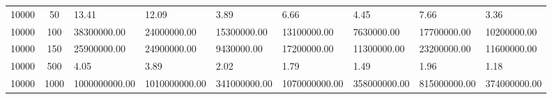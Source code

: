 \begin{table*}
\begin{center}
\begin{tabular}{cc|lllllll}
10000 & 50   & 13.41         & 12.09         & 3.89         & 6.66          & 4.45         & 7.66         & 3.36         \\
10000 & 100  & 38300000.00   & 24000000.00   & 15300000.00  & 13100000.00   & 7630000.00   & 17700000.00  & 10200000.00  \\
10000 & 150  & 25900000.00   & 24900000.00   & 9430000.00   & 17200000.00   & 11300000.00  & 23200000.00  & 11600000.00  \\
10000 & 500  & 4.05          & 3.89          & 2.02         & 1.79          & 1.49         & 1.96         & 1.18         \\
10000 & 1000 & 1000000000.00 & 1010000000.00 & 341000000.00 & 1070000000.00 & 358000000.00 & 815000000.00 & 374000000.00 \\ \hline
\end{tabular}
\end{center}
\end{table*}

